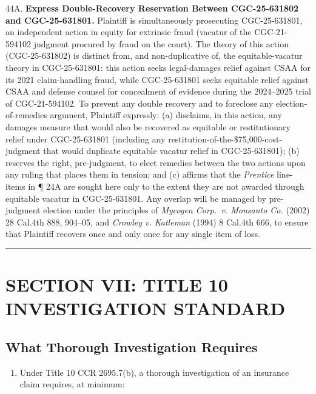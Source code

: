 44A. \textbf{Express Double-Recovery Reservation Between CGC-25-631802 and CGC-25-631801.} Plaintiff is simultaneously prosecuting CGC-25-631801, an independent action in equity for extrinsic fraud (vacatur of the CGC-21-594102 judgment procured by fraud on the court). The theory of this action (CGC-25-631802) is distinct from, and non-duplicative of, the equitable-vacatur theory in CGC-25-631801: this action seeks legal-damages relief against CSAA for its 2021 claim-handling fraud, while CGC-25-631801 seeks equitable relief against CSAA and defense counsel for concealment of evidence during the 2024--2025 trial of CGC-21-594102. To prevent any double recovery and to foreclose any election-of-remedies argument, Plaintiff expressly: (a) disclaims, in this action, any damages measure that would also be recovered as equitable or restitutionary relief under CGC-25-631801 (including any restitution-of-the-\$75,000-cost-judgment that would duplicate equitable vacatur relief in CGC-25-631801); (b) reserves the right, pre-judgment, to elect remedies between the two actions upon any ruling that places them in tension; and (c) affirms that the \emph{Prentice} line-items in ¶ 24A are sought here only to the extent they are not awarded through equitable vacatur in CGC-25-631801. Any overlap will be managed by pre-judgment election under the principles of \emph{Mycogen Corp.~v. Monsanto Co.} (2002) 28 Cal.4th 888, 904--05, and \emph{Crowley v. Katleman} (1994) 8 Cal.4th 666, to ensure that Plaintiff recovers once and only once for any single item of loss.

\begin{center}\rule{0.5\linewidth}{0.5pt}\end{center}

\label{toc:section-vii-title-10-investigation-standard}
\section{SECTION VII: TITLE 10 INVESTIGATION STANDARD}\label{section-vii-title-10-investigation-standard}

\subsection{What Thorough Investigation Requires}\label{what-thorough-investigation-requires}

\begin{enumerate}
\def\labelenumi{\arabic{enumi}.}
\setcounter{enumi}{44}
\tightlist
\item
  Under Title 10 CCR \textsection{} 2695.7(b), a thorough investigation of an insurance claim requires, at minimum:
\end{enumerate}

